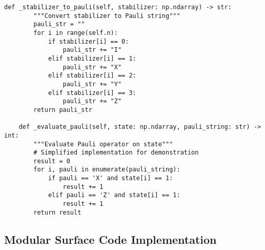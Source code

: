 \documentclass[12pt,a4paper]{article}
\begin{document}
\begin{lstlisting}[style=python,caption=Core categorical QEC classes]
    def _stabilizer_to_pauli(self, stabilizer: np.ndarray) -> str:
        """Convert stabilizer to Pauli string"""
        pauli_str = ""
        for i in range(self.n):
            if stabilizer[i] == 0:
                pauli_str += "I"
            elif stabilizer[i] == 1:
                pauli_str += "X"
            elif stabilizer[i] == 2:
                pauli_str += "Y"
            elif stabilizer[i] == 3:
                pauli_str += "Z"
        return pauli_str
    
    def _evaluate_pauli(self, state: np.ndarray, pauli_string: str) -> int:
        """Evaluate Pauli operator on state"""
        # Simplified implementation for demonstration
        result = 0
        for i, pauli in enumerate(pauli_string):
            if pauli == 'X' and state[i] == 1:
                result += 1
            elif pauli == 'Z' and state[i] == 1:
                result += 1
        return result
\end{lstlisting}

\subsection{Modular Surface Code Implementation}
\end{document}
